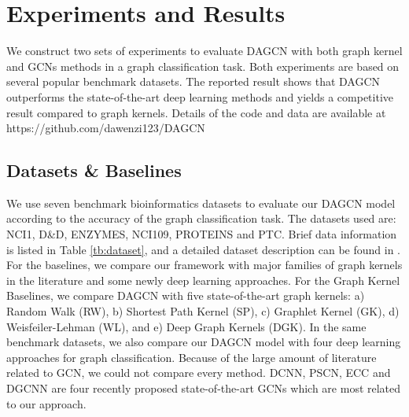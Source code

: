 \documentclass[conference]{IEEEtran}
\begin{document}
	\section{Experiments and Results} We construct two sets of experiments to evaluate DAGCN with both graph kernel and GCNs methods in a graph classification task. Both experiments are based on several popular benchmark datasets. The reported result shows that DAGCN outperforms the state-of-the-art deep learning methods and yields a competitive result compared to graph kernels. Details of the code and data are available at https://github.com/dawenzi123/DAGCN

    \subsection{Datasets \& Baselines}We use seven benchmark bioinformatics datasets to evaluate our DAGCN model according to the accuracy of the graph classification task. The datasets used are: NCI1, D\&D, ENZYMES, NCI109, PROTEINS and PTC. Brief data information is listed in Table \ref{tb:dataset}, and a detailed dataset description can be found in \cite{yanardag2015deep}. For the baselines, we compare our framework with major families of graph kernels in the literature and some newly deep learning approaches. For the Graph Kernel Baselines, we compare DAGCN with five state-of-the-art graph kernels: a) Random Walk (RW)\cite{gartner2003graph}, b) Shortest Path Kernel (SP)\cite{borgwardt2005shortest}, c) Graphlet Kernel (GK)\cite{kondor2009graphlet}, d) Weisfeiler-Lehman (WL)\cite{shervashidze2011weisfeiler}, and e) Deep Graph Kernels (DGK)\cite{yanardag2015deep}. In the same benchmark datasets, we also compare our DAGCN model with four deep learning approaches for graph classification. Because of the large amount of literature related to GCN, we could not compare every method. DCNN, PSCN, ECC and DGCNN are four recently proposed state-of-the-art GCNs which are most related to our approach. 

    \begin{table}[ht]
    \caption{}
    \centering
    \label{tb:dataset}
    \end{table}
    
\end{document}
